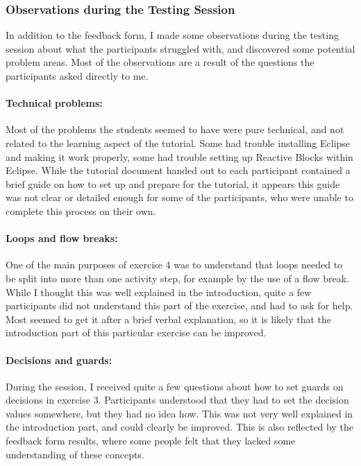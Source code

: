 \subsubsection{Observations during the Testing Session}
In addition to the feedback form, I made some observations during the testing session about what the participants struggled with, and discovered some potential problem areas. Most of the observations are a result of the questions the participants asked directly to me.

\paragraph{Technical problems:} Most of the problems the students seemed to have were pure technical, and not related to the learning aspect of the tutorial. Some had trouble installing Eclipse and making it work properly, some had trouble setting up Reactive Blocks within Eclipse. While the tutorial document handed out to each participant contained a brief guide on how to set up and prepare for the tutorial, it appears this guide was not clear or detailed enough for some of the participants, who were unable to complete this process on their own.

\paragraph{Loops and flow breaks:} One of the main purposes of exercise 4 was to understand that loops needed to be split into more than one activity step, for example by the use of a flow break. While I thought this was well explained in the introduction, quite a few participants did not understand this part of the exercise, and had to ask for help. Most seemed to get it after a brief verbal explanation, so it is likely that the introduction part of this particular exercise can be improved.

\paragraph{Decisions and guards:} During the session, I received quite a few questions about how to set guards on decisions in exercise 3. Participants understood that they had to set the decision values somewhere, but they had no idea how. This was not very well explained in the introduction part, and could clearly be improved. This is also reflected by the feedback form results, where some people felt that they lacked some understanding of these concepts.

